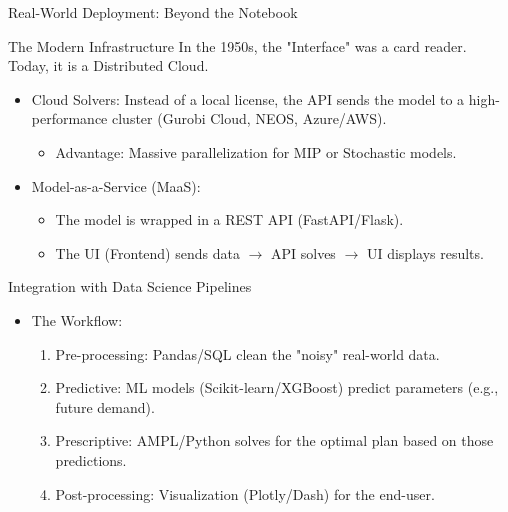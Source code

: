 \documentclass[presentation, aspectratio=169]{beamer}
\begin{document}
\begin{frame}[label={sec:orgb55d0ab}]{Real-World Deployment: Beyond the Notebook}
\begin{block}{The Modern Infrastructure}
In the 1950s, the "Interface" was a card reader. Today, it is a \alert{\alert{Distributed Cloud}}.

\begin{itemize}
\item \alert{\alert{Cloud Solvers}}: Instead of a local license, the API sends the model to a high-performance cluster (Gurobi Cloud, NEOS, Azure/AWS).
\begin{itemize}
\item \alert{Advantage}: Massive parallelization for MIP or Stochastic models.
\end{itemize}
\item \alert{\alert{Model-as-a-Service (MaaS)}}:
\begin{itemize}
\item The model is wrapped in a \alert{\alert{REST API}} (FastAPI/Flask).
\item The UI (Frontend) sends data \(\to\) API solves \(\to\) UI displays results.
\end{itemize}
\end{itemize}
\end{block}

\begin{block}{Integration with Data Science Pipelines}
\begin{itemize}
\item \alert{\alert{The Workflow}}:
\begin{enumerate}
\item \alert{\alert{Pre-processing}}: Pandas/SQL clean the "noisy" real-world data.
\item \alert{\alert{Predictive}}: ML models (Scikit-learn/XGBoost) predict parameters (e.g., future demand).
\item \alert{\alert{Prescriptive}}: AMPL/Python solves for the optimal plan based on those predictions.
\item \alert{\alert{Post-processing}}: Visualization (Plotly/Dash) for the end-user.
\end{enumerate}
\end{itemize}
\end{block}
\end{frame}
\end{document}
